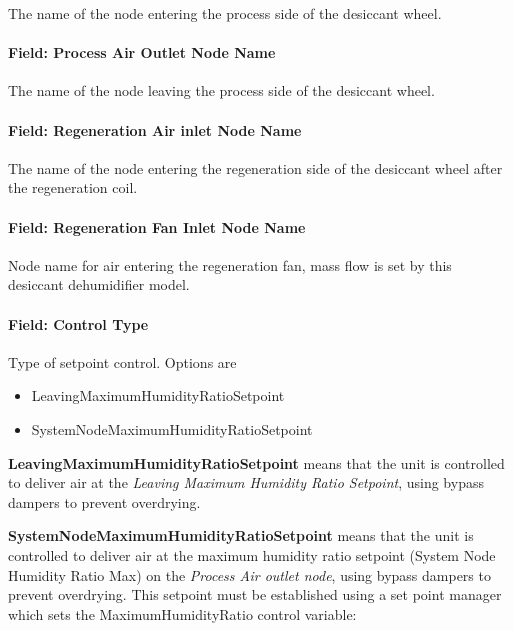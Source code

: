 The name of the node entering the process side of the desiccant wheel.

\paragraph{Field: Process Air Outlet Node Name}\label{field-process-air-outlet-node-name}

The name of the node leaving the process side of the desiccant wheel.

\paragraph{Field: Regeneration Air inlet Node Name}\label{field-regeneration-air-inlet-node-name}

The name of the node entering the regeneration side of the desiccant wheel after the regeneration coil.

\paragraph{Field: Regeneration Fan Inlet Node Name}\label{field-regeneration-fan-inlet-node-name}

Node name for air entering the regeneration fan, mass flow is set by this desiccant dehumidifier model.

\paragraph{Field: Control Type}\label{field-control-type-000}

Type of setpoint control. Options are

\begin{itemize}
\item
  LeavingMaximumHumidityRatioSetpoint
\item
  SystemNodeMaximumHumidityRatioSetpoint
\end{itemize}

\textbf{LeavingMaximumHumidityRatioSetpoint} means that the unit is controlled to deliver air at the \emph{Leaving Maximum Humidity Ratio Setpoint}, using bypass dampers to prevent overdrying.

\textbf{SystemNodeMaximumHumidityRatioSetpoint} means that the unit is controlled to deliver air at the maximum humidity ratio setpoint (System Node Humidity Ratio Max) on the \emph{Process Air outlet node}, using bypass dampers to prevent overdrying. This setpoint must be established using a set point manager which sets the MaximumHumidityRatio control variable:

